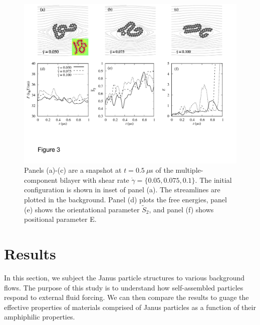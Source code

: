 \documentclass[prb,preprint,showpacs,preprintnumbers,amsmath,amssymb,longbibliography]{revtex4-1}
\begin{document}
\begin{figure}
  \begin{center}
   \includegraphics[width=1.0\textwidth]{Figures/Figure3.pdf}
  \end{center}
  \caption{
    \label{fig:BC1_shear}
    Panels (a)-(c) are a snapshot at $t=0.5\ \mu$s of the multiple-component bilayer
    with shear rate $\dot \gamma = \{0.05, 0.075, 0.1\}$.
    The initial configuration is shown in inset of panel (a).
    The streamlines are plotted in the background.
    Panel (d) plots the free energies,
    panel (e) shows the orientational parameter $\tilde{S}_2$,
    and panel (f) shows positional parameter E.
}
\end{figure}



\section{Results}
\label{sec:results}
In this section, we subject the Janus particle structures to various background
flows.  The purpose of this study is to understand how self-assembled particles
respond to external fluid forcing.  We can then compare the results to guage
the effective properties of materials comprised of Janus particles as a function
of their amphiphilic properties.  
\end{document}
